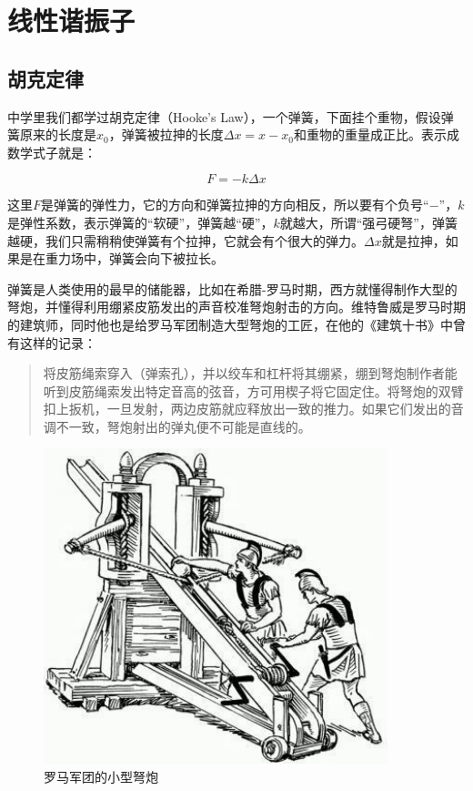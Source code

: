 \section{线性谐振子}

\subsection{胡克定律}

中学里我们都学过胡克定律（Hooke's Law），一个弹簧，下面挂个重物，假设弹簧原来的长度是$x_0$，弹簧被拉抻的长度$\Delta x = x - x_0$和重物的重量成正比。表示成数学式子就是：

\begin{equation}
F = - k \Delta x
\end{equation}

这里$F$是弹簧的弹性力，它的方向和弹簧拉抻的方向相反，所以要有个负号“$-$”，$k$是弹性系数，表示弹簧的“软硬”，弹簧越“硬”，$k$就越大，所谓“强弓硬弩”，弹簧越硬，我们只需稍稍使弹簧有个拉抻，它就会有个很大的弹力。$\Delta x$就是拉抻，如果是在重力场中，弹簧会向下被拉长。

弹簧是人类使用的最早的储能器，比如在希腊-罗马时期，西方就懂得制作大型的弩炮，并懂得利用绷紧皮筋发出的声音校准弩炮射击的方向。维特鲁威是罗马时期的建筑师，同时他也是给罗马军团制造大型弩炮的工匠，在他的《建筑十书》中曾有这样的记录：

\begin{quote}
将皮筋绳索穿入（弹索孔），并以绞车和杠杆将其绷紧，绷到弩炮制作者能听到皮筋绳索发出特定音高的弦音，方可用楔子将它固定住。将弩炮的双臂扣上扳机，一旦发射，两边皮筋就应释放出一致的推力。如果它们发出的音调不一致，弩炮射出的弹丸便不可能是直线的。
\end{quote}

\begin{figure}[htbp]
\begin{center}
\includegraphics[width=10cm]{LinearOscillator/roman-catapult.png}
\caption{罗马军团的小型弩炮}
\end{center}
\end{figure}

